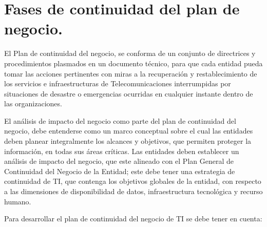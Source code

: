 \documentclass[conference]{IEEEtran}
\begin{document}
\section{Fases de continuidad del plan de negocio.}
El Plan de continuidad del negocio, se conforma de un conjunto de directrices y
procedimientos plasmados en un documento técnico, para que cada entidad pueda
tomar las acciones pertinentes con miras a la recuperación y restablecimiento de
los servicios e infraestructuras de Telecomunicaciones interrumpidas por situaciones de desastre o emergencias ocurridas en cualquier instante dentro de las organizaciones.

El análisis de impacto del negocio como parte del plan de continuidad del negocio,
debe entenderse como un marco conceptual sobre el cual las entidades deben
planear integralmente los alcances y objetivos, que permiten proteger la
información, en todas sus áreas críticas.
Las entidades deben establecer un análisis de impacto del negocio, que este
alineado con el Plan General de Continuidad del Negocio de la Entidad; este debe
tener una estrategia de continuidad de TI, que contenga los objetivos globales de la
entidad, con respecto a las dimensiones de disponibilidad de datos, infraestructura
tecnológica y recurso humano.

Para desarrollar el plan de continuidad del negocio de TI se debe tener en cuenta:
\end{document}
